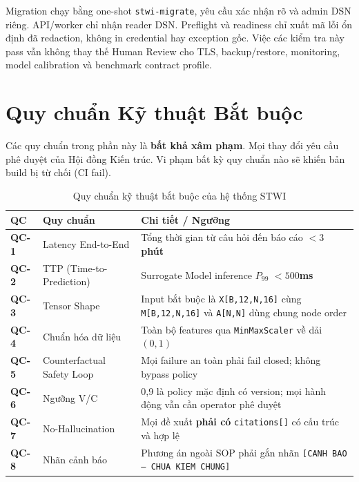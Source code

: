 Migration chạy bằng one-shot \texttt{stwi-migrate}, yêu cầu xác nhận rõ và admin
DSN riêng. API/worker chỉ nhận reader DSN. Preflight và readiness chỉ xuất mã lỗi
ổn định đã redaction, không in credential hay exception gốc. Việc các kiểm tra
này pass vẫn không thay thế Human Review cho TLS, backup/restore, monitoring,
model calibration và benchmark contract profile.

\section{Quy chuẩn Kỹ thuật Bắt buộc}

\begin{tcolorbox}[dangerbox]
Các quy chuẩn trong phần này là \textbf{bất khả xâm phạm}. Mọi thay đổi yêu cầu phê duyệt của Hội đồng Kiến trúc. Vi phạm bất kỳ quy chuẩn nào sẽ khiến bản build bị từ chối (CI fail).
\end{tcolorbox}

\begin{table}[H]
\centering
\caption{Quy chuẩn kỹ thuật bắt buộc của hệ thống STWI}
\label{tab:constraints}
\renewcommand{\arraystretch}{1.5}
\begin{tabular}{>{\bfseries}p{1cm} p{4.5cm} p{6cm}}
\toprule
\textbf{QC} & \textbf{Quy chuẩn} & \textbf{Chi tiết / Ngưỡng} \\
\midrule
QC-1 & Latency End-to-End & Tổng thời gian từ câu hỏi đến báo cáo \textbf{$< 3$ phút} \\
\rowcolor{rowgray}
QC-2 & TTP (Time-to-Prediction) & Surrogate Model inference $P_{99}$ \textbf{$< 500$ms} \\
QC-3 & Tensor Shape & Input bắt buộc là \texttt{X[B,12,N,16]} cùng \texttt{M[B,12,N,16]} và \texttt{A[N,N]} dùng chung node order \\
\rowcolor{rowgray}
QC-4 & Chuẩn hóa dữ liệu & Toàn bộ features qua \texttt{MinMaxScaler} về dải \textbf{$(0, 1)$} \\
QC-5 & Counterfactual Safety Loop & Mọi failure an toàn phải fail closed; không bypass policy \\
\rowcolor{rowgray}
QC-6 & Ngưỡng V/C & 0,9 là policy mặc định có version; mọi hành động vẫn cần operator phê duyệt \\
QC-7 & No-Hallucination & Mọi đề xuất \textbf{phải có} \texttt{citations[]} có cấu trúc và hợp lệ \\
\rowcolor{rowgray}
QC-8 & Nhãn cảnh báo & Phương án ngoài SOP phải gắn nhãn \texttt{[CANH BAO -- CHUA KIEM CHUNG]} \\
\bottomrule
\end{tabular}
\end{table}
